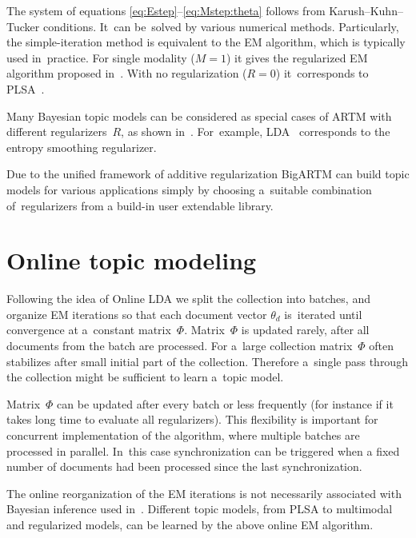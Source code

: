 \documentclass[russian,english]{llncs}
\begin{document}
The system of equations \eqref{eq:Estep}--\eqref{eq:Mstep:theta}
follows from Karush--Kuhn--Tucker conditions.
It~can be~solved by various numerical methods.
Particularly,
the simple-iteration method is equivalent to the EM algorithm,
which is typically used in~practice.
For single modality (${M=1}$) it gives the regularized EM algorithm
proposed in~\cite{voron14dan-eng}.
With no regularization (${R=0}$) it~corresponds to PLSA~\cite{hofmann99plsi}.

Many Bayesian topic models can be considered
as special cases of ARTM with different regularizers~$R$,
as shown in~\cite{voron14mlj,voron14aist}.
For~example,
LDA~\cite{blei03latent} corresponds to the entropy smoothing regularizer.

Due to the unified framework of additive regularization
BigARTM can build topic models for various applications
simply by choosing a~suitable combination of~regularizers
from a build-in user extendable library.

\section{Online topic modeling}
\label{sec:Online}

Following the idea of Online LDA \cite{hoffman10online}
we split the collection into batches,
and organize EM iterations so that
each document vector $\theta_d$ is~iterated until convergence at a~constant matrix~$\Phi$.
\mbox{Matrix}~$\Phi$ is updated rarely, after all documents from the batch are processed.
For a~large collection
matrix~$\Phi$ often stabilizes after small initial part of the collection.
Therefore a~single pass through the collection might be sufficient to learn a~topic model.

\mbox{Matrix}~$\Phi$ can be updated after every batch or less frequently
(for instance if it takes long time to evaluate all regularizers).
This flexibility is important for concurrent implementation of the algorithm,
where multiple batches are processed in parallel.
In~this case synchronization can be triggered when a fixed number of documents had been processed since the last synchronization.

The online reorganization of the EM iterations
is not necessarily associated with Bayesian inference used in~\cite{hoffman10online}.
Different topic models, from PLSA to multimodal and regularized models,
can be learned by the above online EM algorithm.
\end{document}

